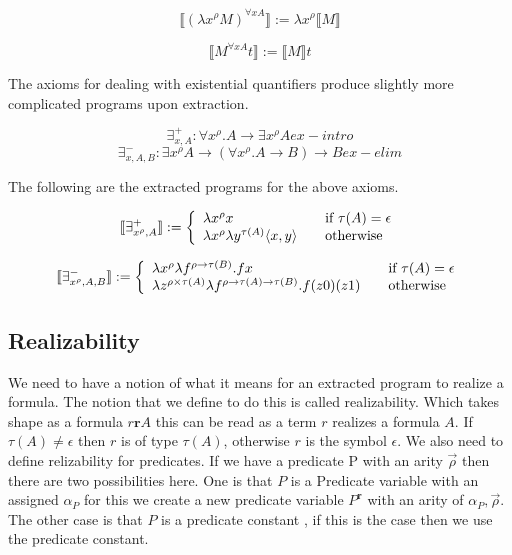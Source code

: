 $$\llbracket ( \lambda x^{\rho} M)^{\forall x A} \rrbracket := \lambda x^{\rho} \llbracket   M \rrbracket$$





$$\llbracket M^{\forall x A} t \rrbracket := \llbracket M \rrbracket t$$



The axioms for dealing with existential quantifiers produce slightly more
complicated programs upon extraction. 

$$ \exists^+_{x,A} : \forall x^{\rho}.A \to \exists x^{\rho} A    ex-intro$$
$$ \exists^-_{x,A,B} : \exists x^{\rho} A \to (\forall x^{\rho}. A \to B) \to
B  ex-elim$$

The following are the extracted programs for the above axioms.

\[ \llbracket \exists^{+}_{x^{\rho}, A} \rrbracket := \left\{ 
\begin{array}{l l}
\lambda x^{\rho} x  & \quad \text{if $\tau (A) = \epsilon$} \\ 
\lambda x^{\rho} \lambda y^{\tau (A)} \langle x,y \rangle & \quad \text{otherwise} \\

\end{array} \right.
\]



\[ \llbracket \exists^{-}_{x^{\rho}, A, B} \rrbracket := \left\{ 
\begin{array}{l l}
\lambda x^{\rho} \lambda f^{\rho \to \tau (B)}. f x  & \quad \text{if $\tau (A) = \epsilon$} \\ 
\lambda z^{\rho \times \tau (A)} \lambda f^{\rho \to \tau (A) \to \tau (B)}. f
(z0) (z1) & \quad \text{otherwise} \\

\end{array} \right.
\]



\subsection*{Realizability}
We need to have a notion of what it means for an extracted program to realize
a formula. The notion that we define to do this is called realizability. Which takes shape as a formula $r \textbf{r} A$ this can be read as
a term $r$ realizes a formula $A$. If $\tau(A) \neq \epsilon$ then $r$ is of type $\tau (A)$,
otherwise $r$ is the symbol $\epsilon$. We also need to define relizability
for predicates. If we have a predicate P
with an arity $\vec{\rho}$ then there are two possibilities here. One is that
$P$ is a Predicate variable with an assigned $\alpha_P$ for this we create a new
predicate variable $P^{\textbf{r}}$ with an arity of $\alpha_P,\vec{\rho}$. 
The other case is that $P$ is a predicate constant , if this is the case then
we use the predicate constant.



